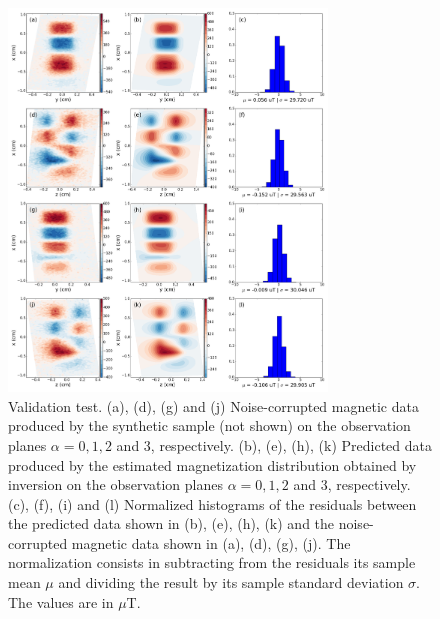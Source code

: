 \documentclass[galley,gc]{agutex}
\begin{document}
 \begin{figure}
 \noindent \includegraphics[width=20pc]{Figs/Fig5_LQ.png}
 \caption{Validation test. (a), (d), (g) and (j) Noise-corrupted
 magnetic data produced by the synthetic sample (not shown) on the
 observation planes $\alpha = 0, 1, 2$ and $3$, respectively.
 (b), (e), (h), (k) Predicted data produced by the estimated
 magnetization distribution obtained by inversion on the
 observation planes $\alpha = 0, 1, 2$ and $3$, respectively.
 (c), (f), (i) and (l) Normalized histograms of the residuals between the
 predicted data shown in (b), (e), (h), (k) and the 
 noise-corrupted magnetic data shown in (a), (d), (g), (j). 
 The normalization
 consists in subtracting from the residuals its sample mean $\mu$ 
 and dividing the result by its sample standard deviation $\sigma$.
 The values are in $\mu$T.}
 \label{fig:datafit-validation}
 \end{figure}
 
\end{document}
